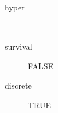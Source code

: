 \begin{description}
	\item[hyper]\ 
	 \item[ survival ] FALSE 
	 \item[ discrete ] TRUE 
\end{description}
